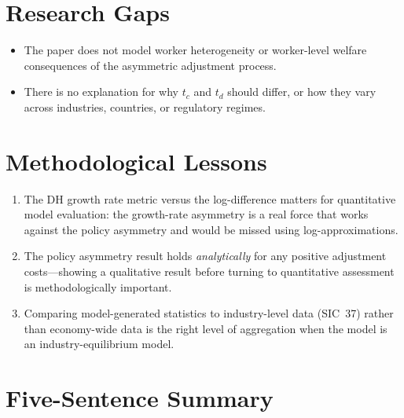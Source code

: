 \section{Research Gaps}

\begin{itemize}
  \item The paper does not model worker heterogeneity or worker-level welfare
    consequences of the asymmetric adjustment process.
  \item There is no explanation for why $t_c$ and $t_d$ should differ, or
    how they vary across industries, countries, or regulatory regimes.
\end{itemize}

\section{Methodological Lessons}

\begin{enumerate}
  \item The DH growth rate metric versus the log-difference matters for
    quantitative model evaluation: the growth-rate asymmetry is a real force
    that works against the policy asymmetry and would be missed using
    log-approximations.
  \item The policy asymmetry result holds \emph{analytically} for any positive
    adjustment costs---showing a qualitative result before turning to
    quantitative assessment is methodologically important.
  \item Comparing model-generated statistics to industry-level data (SIC~37)
    rather than economy-wide data is the right level of aggregation when the
    model is an industry-equilibrium model.
\end{enumerate}

\section*{Five-Sentence Summary}

